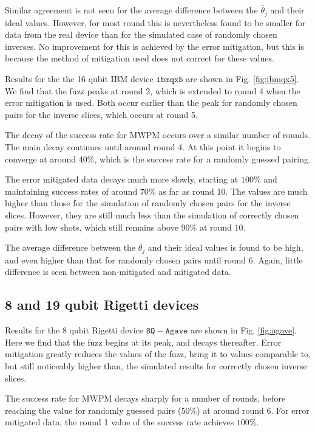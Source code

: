 \documentclass[aps,prl,twocolumn,showpacs,preprintnumbers]{revtex4-1}
\begin{document}
Similar agreement is not seen for the average difference between the $\tilde{\theta_j}$ and their ideal values. However, for most round this is nevertheless found to be smaller for data from the real device than for the simulated case of  randomly chosen inverses. No improvement for this is achieved by the error mitigation, but this is because the method of mitigation used does not correct for these values.

Results for the the 16 qubit IBM device $\mathtt{ibmqx5}$ are shown in Fig. \ref{fig:ibmqx5}. We find that the fuzz peaks at round 2, which is extended to round 4 when the error mitigation is used. Both occur earlier than the peak for randomly chosen pairs for the inverse slices, which occurs at round 5.

The decay of the success rate for MWPM occurs over a similar number of rounds. The main decay continues until around round 4. At this point it begins to converge at around $40\%$, which is the success rate for a randomly guessed pairing.

The error mitigated data decays much more slowly, starting at $100\%$ and maintaining success rates of around $70\%$ as far as round 10. The values are much higher than those for the simulation of randomly chosen pairs for the inverse slices. However, they are still much less than the simulation of correctly chosen pairs with low shots, which still remains above $90\%$ at round 10.

The average difference between the $\tilde{\theta_j}$ and their ideal values is found to be high, and even higher than that for randomly chosen pairs until round 6. Again, little difference is seen between non-mitigated and mitigated data.


\subsection{8 and 19 qubit Rigetti devices}  \label{subsec:rigetti}

Results for the 8 qubit Rigetti device $\mathtt{8Q-Agave}$ are shown in Fig. \ref{fig:agave}. Here we find that the fuzz begins at its peak, and decays thereafter. Error mitigation greatly reduces the values of the fuzz, bring it to values comparable to, but still noticeably higher than, the simulated results for correctly chosen inverse slices.

The success rate for MWPM decays sharply for a number of rounds, before reaching the value for randomly guessed pairs ($50\%$) at around round 6. For error mitigated data, the round 1 value of the success rate achieves $100\%$.
\end{document}
